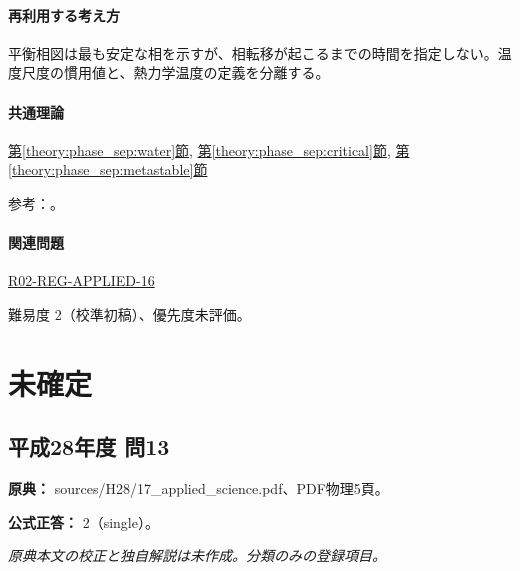 \paragraph{再利用する考え方} 平衡相図は最も安定な相を示すが、相転移が起こるまでの時間を指定しない。温度尺度の慣用値と、熱力学温度の定義を分離する。

\paragraph{共通理論} \hyperref[theory:phase_sep:water]{第\ref*{theory:phase_sep:water}節}, \hyperref[theory:phase_sep:critical]{第\ref*{theory:phase_sep:critical}節}, \hyperref[theory:phase_sep:metastable]{第\ref*{theory:phase_sep:metastable}節}

\par 参考：\cite{iapws_supercooled2015,iapws95_2018,si_brochure9}。

\paragraph{関連問題} \hyperref[q:r02-reg-applied-16]{R02-REG-APPLIED-16}

\par 難易度 2（校準初稿）、優先度未評価。

\section{未確定}

\subsection{平成28年度 問13}
\label{q:h28-reg-applied-13}

\noindent\textbf{原典：} sources/H28/17\_applied\_science.pdf、PDF物理5頁。

\textbf{公式正答：} 2（single）。

\par\textit{原典本文の校正と独自解説は未作成。分類のみの登録項目。}

